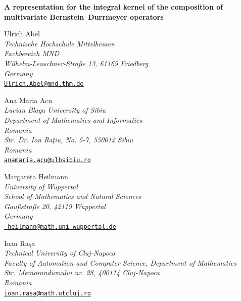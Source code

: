 \documentclass[12pt,reqno]{article}
\begin{document}
\begin{center}
\vskip1cm

{\LARGE \textbf{A representation for the integral kernel of the composition
of multivariate Bernstein--Durrmeyer operators}}

\vspace{2cm}

{\large Ulrich Abel}\\[0pt]
\textit{Technische Hochschule Mittelhessen}\\[0pt]
\textit{Fachbereich MND}\\[0pt]
\textit{Wilhelm-Leuschner-Stra\ss e 13, 61169 Friedberg }\\[0pt]
\textit{Germany}\\[0pt]
\href{mailto:Ulrich.Abel@mnd.thm.de}{\texttt{Ulrich.Abel@mnd.thm.de}}

\vspace{1cm}

{\large Ana Maria Acu}\\[0pt]
\textit{Lucian Blaga University of Sibiu}\\[0pt]
\textit{Department of Mathematics and Informatics}\\[0pt]
\textit{Romania}\\[0pt]
\textit{Str. Dr. Ion Ra\c tiu, No. 5-7, 550012 Sibiu}\\[0pt]
\textit{Romania}\\[0pt]
\href{mailto:anamaria.acu@ulbsibiu.ro}{\texttt{anamaria.acu@ulbsibiu.ro}}

\vspace{1cm}

{\large Margareta Heilmann}\\[0pt]
\textit{University of Wuppertal}\\[0pt]
\textit{School of Mathematics and Natural Sciences}\\[0pt]
\textit{Gau\ss stra\ss e 20, 42119 Wuppertal}\\[0pt]
\textit{Germany}\\[0pt]
\href{mailto:heilmann@math.uni-wuppertal.de}{\texttt{%
heilmann@math.uni-wuppertal.de}}

\vspace{1cm}

{\large Ioan Ra\c sa}\\[0pt]
\textit{Technical University of Cluj-Napoca}\\[0pt]
\textit{Faculty of Automation and Computer Science, Department of Mathematics%
}\\[0pt]
\textit{Str. Memorandumului nr. 28, 400114 Cluj-Napoca}\\[0pt]
\textit{Romania}\\[0pt]
\href{mailto:ioan.rasa@math.utcluj.ro}{\texttt{ioan.rasa@math.utcluj.ro}}
\end{center}
\end{document}
